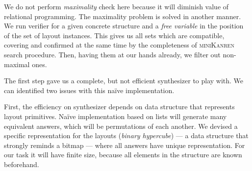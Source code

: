 We do not perform \emph{maximality} check here because it will diminish value of relational programming.
%
The maximality problem is solved in another manner.
We run verifier for a given concrete structure and a \emph{free variable} in
the position of the set of layout instances.
This gives us all sets which are compatible, covering and confirmed at
the same time by the completeness of \textsc{miniKanren} search procedure.
Then, having them at our hands already, we filter out non-maximal ones.

The first step gave us a complete, but not efficient synthesizer to play with.
We can identified two issues with this na\"ive implementation.

First, the efficiency on synthesizer depends on data structure that represents layout primitives.
Na\"ive implementation based on lists will generate many equivalent answers, which will be permutations of each another.
We devised a specific representation for the layouts (\emph{binary hypercube}) --- a data structure that strongly reminds a bitmap --- where all answers have unique representation.
For our task it will have finite size, because all elements in the structure are known beforehand.

